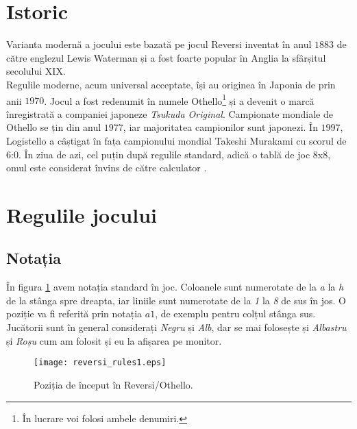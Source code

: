 \documentclass[12pt,twoside,a4paper,fleqn]{book}
\theoremstyle{definition}
\begin{document}
\section{Istoric}
Varianta modernă a jocului este bazată pe jocul Reversi inventat în anul $1883$ de către englezul Lewis Waterman și a fost foarte popular în Anglia la sfârșitul secolului XIX.\\
Regulile moderne, acum universal acceptate, își au originea în Japonia de prin anii $1970$. Jocul a fost redenumit în numele Othello\footnote{În lucrare voi folosi ambele denumiri.} și a devenit o marcă înregistrată a companiei japoneze \emph{Tsukuda Original}. Campionate mondiale de Othello se țin din anul $1977$, iar majoritatea campionilor sunt japonezi. În $1997$, Logistello \cite{logistello} a câștigat în fața campionului mondial Takeshi Murakami cu scorul de 6:0. În ziua de azi, cel puțin după regulile standard, adică o tablă de joc 8x8, omul este considerat învins de către calculator \cite{man_vs_machine}.

\section{Regulile jocului}
\subsection{Notația}
În figura \ref{fig:rev_rules1} avem notația standard în joc. Coloanele sunt numerotate de la \emph{a} la \emph{h} de la stânga spre dreapta, iar liniile sunt numerotate de la \emph{1} la \emph{8} de sus în jos. O poziție va fi referită prin notația $a1$, de exemplu pentru colțul stânga sus. Jucătorii sunt în general considerați \emph{Negru} și \emph{Alb}, dar se mai folosește și \emph{Albastru} și \emph{Roșu} cum am folosit și eu la afișarea pe monitor.
\begin{figure}[h]
\begin{center}
\texttt{[image: reversi\_rules1.eps]}
\caption{\small{Poziția de început în Reversi/Othello.}}
\label{fig:rev_rules1}
\end{center}
\end{figure}
\end{document}
